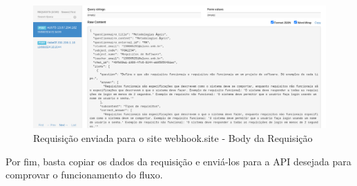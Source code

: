 \begin{figure}[H]
    \centering
    \includegraphics[width=1\textwidth]{figuras/webhook_2.png}
    \caption{Requisição enviada para o site webhook.site - Body da Requisição}
    \label{fig:report_questions}
\end{figure}

Por fim, basta copiar os dados da requisição e enviá-los para a API desejada para comprovar o funcionamento do fluxo.